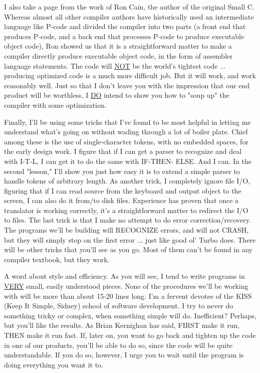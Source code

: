 \documentclass[float=false, crop=false]{standalone}
\begin{document}
I also take a page from the work of Ron Cain, the author of the original Small
C. Whereas almost all other compiler authors have historically used an
intermediate language like P-code and divided the compiler into two parts (a
front end that produces P-code, and a back end that processes P-code to produce
executable object code), Ron showed us that it is a straightforward matter to
make a compiler directly produce executable object code, in the form of
assembler language statements. The code will \underline{NOT} be the world's tightest code
... producing optimized code is a much more difficult job. But it will work, and
work reasonably well. Just so that I don't leave you with the impression that
our end product will be worthless, I \underline{DO} intend to show you how to "soup up"
the compiler with some optimization.

Finally, I'll be using some tricks that I've found to be most helpful in letting
me understand what's going on without wading through a lot of boiler plate.
Chief among these is the use of single-character tokens, with no embedded
spaces, for the early design work. I figure that if I can get a parser to
recognize and deal with I-T-L, I can get it to do the same with IF-THEN- ELSE.
And I can. In the second "lesson," I'll show you just how easy it is to extend a
simple parser to handle tokens of arbitrary length. As another trick, I
completely ignore file I/O, figuring that if I can read source from the keyboard
and output object to the screen, I can also do it from/to disk files. Experience
has proven that once a translator is working correctly, it's a straightforward
matter to redirect the I/O to files. The last trick is that I make no attempt to
do error correction/recovery. The programs we'll be building will RECOGNIZE
errors, and will not CRASH, but they will simply stop on the first error ...
just like good ol' Turbo does. There will be other tricks that you'll see as you
go. Most of them can't be found in any compiler textbook, but they work.

A word about style and efficiency. As you will see, I tend to write programs in
\underline{VERY} small, easily understood pieces. None of the procedures we'll be working
with will be more than about 15-20 lines long. I'm a fervent devotee of the KISS
(Keep It Simple, Sidney) school of software development. I try to never do
something tricky or complex, when something simple will do. Inefficient?
Perhaps, but you'll like the results. As Brian Kernighan has said, FIRST make it
run, THEN make it run fast. If, later on, you want to go back and tighten up the
code in one of our products, you'll be able to do so, since the code will be
quite understandable. If you do so, however, I urge you to wait until the
program is doing everything you want it to.
\end{document}
